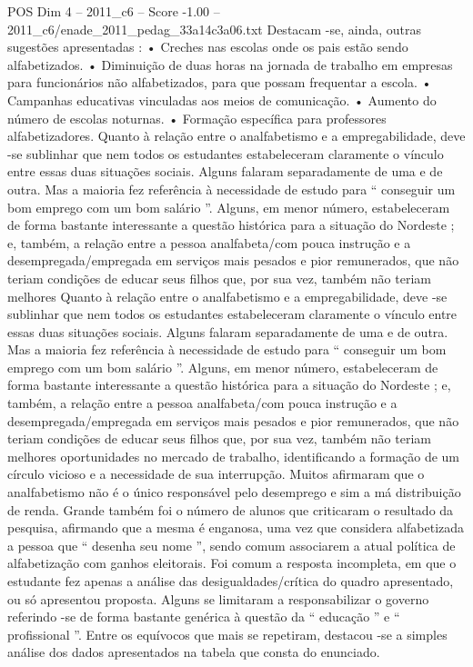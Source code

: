 \begin{textsample}{POS Dim 4 – 2011\_c6 – Score -1.00 – 2011\_c6/enade\_2011\_pedag\_33a14c3a06.txt}
Destacam -se, ainda, outras sugestões apresentadas : • Creches nas escolas onde os pais estão sendo alfabetizados. • Diminuição de duas horas na jornada de trabalho em empresas para funcionários não alfabetizados, para que possam frequentar a escola. • Campanhas educativas vinculadas aos meios de comunicação. • Aumento do número de escolas noturnas. • Formação específica para professores alfabetizadores.
Quanto à relação entre o analfabetismo e a empregabilidade, deve -se sublinhar que nem todos os estudantes estabeleceram claramente o vínculo entre essas duas situações sociais.
Alguns falaram separadamente de uma e de outra.
Mas a maioria fez referência à necessidade de estudo para “ conseguir um bom emprego com um bom salário ”.
Alguns, em menor número, estabeleceram de forma bastante interessante a questão histórica para a situação do Nordeste ; e, também, a relação entre a pessoa analfabeta/com pouca instrução e a desempregada/empregada em serviços mais pesados e pior remunerados, que não teriam condições de educar seus filhos que, por sua vez, também não teriam melhores Quanto à relação entre o analfabetismo e a empregabilidade, deve -se sublinhar que nem todos os estudantes estabeleceram claramente o vínculo entre essas duas situações sociais.
Alguns falaram separadamente de uma e de outra.
Mas a maioria fez referência à necessidade de estudo para “ conseguir um bom emprego com um bom salário ”.
Alguns, em menor número, estabeleceram de forma bastante interessante a questão histórica para a situação do Nordeste ; e, também, a relação entre a pessoa analfabeta/com pouca instrução e a desempregada/empregada em serviços mais pesados e pior remunerados, que não teriam condições de educar seus filhos que, por sua vez, também não teriam melhores oportunidades no mercado de trabalho, identificando a formação de um círculo vicioso e a necessidade de sua interrupção.
Muitos afirmaram que o analfabetismo não é o único responsável pelo desemprego e sim a má distribuição de renda.
Grande também foi o número de alunos que criticaram o resultado da pesquisa, afirmando que a mesma é enganosa, uma vez que considera alfabetizada a pessoa que “ desenha seu nome ”, sendo comum associarem a atual política de alfabetização com ganhos eleitorais.
Foi comum a resposta incompleta, em que o estudante fez apenas a análise das desigualdades/crítica do quadro apresentado, ou só apresentou proposta.
Alguns se limitaram a responsabilizar o governo referindo -se de forma bastante genérica à questão da “ educação ” e “ profissional ”.
Entre os equívocos que mais se repetiram, destacou -se a simples análise dos dados apresentados na tabela que consta do enunciado.

\end{textsample}
